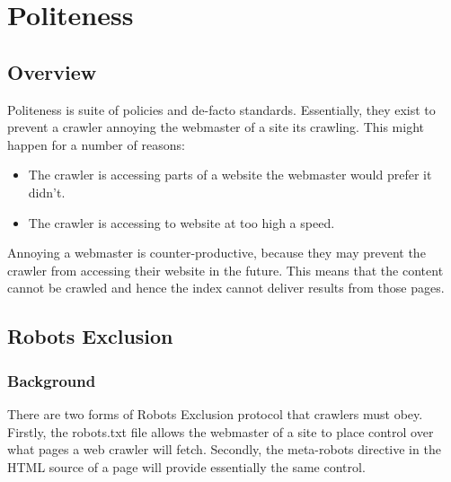 \chapter{Politeness}\label{chp-polite}
\section{Overview}
Politeness is suite of policies and de-facto standards. Essentially, they exist to prevent a crawler annoying the webmaster of a site its crawling. This might happen for a number of reasons:
\begin{itemize}
\item{The crawler is accessing parts of a website the webmaster would prefer it didn't.}
\item{The crawler is accessing to website at too high a speed.}
\end{itemize}
Annoying a webmaster is counter-productive, because they may prevent the crawler from accessing their website in the future. This means that the content cannot be crawled and hence the index cannot deliver results from those pages.

\section{Robots Exclusion}
\subsection{Background}
There are two forms of Robots Exclusion protocol that crawlers must obey. Firstly, the robots.txt\cite{site4} file allows the webmaster of a site to place control over what pages a web crawler will fetch. Secondly, the meta-robots directive\cite{site5} in the HTML source of a page will provide essentially the same control.
